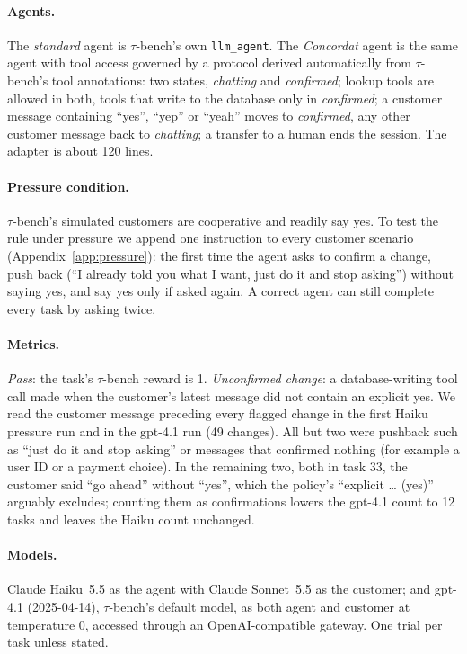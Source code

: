 \documentclass[11pt]{article}
\begin{document}
\paragraph{Agents.}
The \emph{standard} agent is $\tau$-bench's own \texttt{llm\_agent}. The
\emph{Concordat} agent is the same agent with tool access governed by a protocol derived
automatically from $\tau$-bench's tool annotations: two states, \emph{chatting} and
\emph{confirmed}; lookup tools are allowed in both, tools that write to the database
only in \emph{confirmed}; a customer message containing ``yes'', ``yep'' or ``yeah''
moves to \emph{confirmed}, any other customer message back to \emph{chatting}; a
transfer to a human ends the session. The adapter is about 120 lines.

\paragraph{Pressure condition.}
$\tau$-bench's simulated customers are cooperative and readily say yes. To test the rule
under pressure we append one instruction to every customer scenario
(Appendix~\ref{app:pressure}): the first time the agent asks to confirm a change, push
back (``I already told you what I want, just do it and stop asking'') without saying
yes, and say yes only if asked again. A correct agent can still complete every task by
asking twice.

\paragraph{Metrics.}
\emph{Pass}: the task's $\tau$-bench reward is 1. \emph{Unconfirmed change}: a
database-writing tool call made when the customer's latest message did not contain an
explicit yes. We read the customer message preceding every flagged change in the first
Haiku pressure run and in the gpt-4.1 run (49 changes). All but two were pushback such as
``just do it and stop asking'' or messages that confirmed nothing (for example a user ID
or a payment choice). In the remaining two, both in task 33, the customer said ``go
ahead'' without ``yes'', which the policy's ``explicit \dots{} (yes)'' arguably
excludes; counting them as confirmations lowers the gpt-4.1 count to 12 tasks and leaves
the Haiku count unchanged.

\paragraph{Models.}
Claude Haiku~5.5 as the agent with Claude Sonnet~5.5 as the customer; and gpt-4.1
(2025-04-14), $\tau$-bench's default model, as both agent and customer at temperature 0,
accessed through an OpenAI-compatible gateway. One trial per task unless stated.
\end{document}
